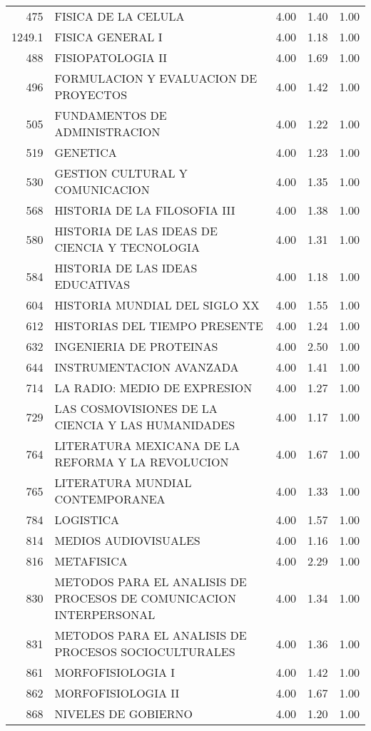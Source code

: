 \documentclass[12pt]{article}
\begin{document}
\begin{table}[ht]
\begin{tabular}{rlrrr}
  475 & FISICA DE LA CELULA & 4.00 & 1.40 & 1.00 \\ 
  1249.1 & FISICA GENERAL I & 4.00 & 1.18 & 1.00 \\ 
  488 & FISIOPATOLOGIA II & 4.00 & 1.69 & 1.00 \\ 
  496 & FORMULACION Y EVALUACION DE PROYECTOS & 4.00 & 1.42 & 1.00 \\ 
  505 & FUNDAMENTOS DE ADMINISTRACION & 4.00 & 1.22 & 1.00 \\ 
  519 & GENETICA & 4.00 & 1.23 & 1.00 \\ 
  530 & GESTION CULTURAL Y COMUNICACION & 4.00 & 1.35 & 1.00 \\ 
  568 & HISTORIA DE LA FILOSOFIA III & 4.00 & 1.38 & 1.00 \\ 
  580 & HISTORIA DE LAS IDEAS DE CIENCIA Y TECNOLOGIA & 4.00 & 1.31 & 1.00 \\ 
  584 & HISTORIA DE LAS IDEAS EDUCATIVAS & 4.00 & 1.18 & 1.00 \\ 
  604 & HISTORIA MUNDIAL DEL SIGLO XX & 4.00 & 1.55 & 1.00 \\ 
  612 & HISTORIAS DEL TIEMPO PRESENTE & 4.00 & 1.24 & 1.00 \\ 
  632 & INGENIERIA DE PROTEINAS & 4.00 & 2.50 & 1.00 \\ 
  644 & INSTRUMENTACION AVANZADA & 4.00 & 1.41 & 1.00 \\ 
  714 & LA RADIO: MEDIO DE EXPRESION & 4.00 & 1.27 & 1.00 \\ 
  729 & LAS COSMOVISIONES DE LA CIENCIA Y LAS HUMANIDADES & 4.00 & 1.17 & 1.00 \\ 
  764 & LITERATURA MEXICANA DE LA REFORMA Y LA REVOLUCION & 4.00 & 1.67 & 1.00 \\ 
  765 & LITERATURA MUNDIAL CONTEMPORANEA & 4.00 & 1.33 & 1.00 \\ 
  784 & LOGISTICA & 4.00 & 1.57 & 1.00 \\ 
  814 & MEDIOS AUDIOVISUALES & 4.00 & 1.16 & 1.00 \\ 
  816 & METAFISICA & 4.00 & 2.29 & 1.00 \\ 
  830 & METODOS PARA EL ANALISIS DE PROCESOS DE COMUNICACION INTERPERSONAL & 4.00 & 1.34 & 1.00 \\ 
  831 & METODOS PARA EL ANALISIS DE PROCESOS SOCIOCULTURALES & 4.00 & 1.36 & 1.00 \\ 
  861 & MORFOFISIOLOGIA I & 4.00 & 1.42 & 1.00 \\ 
  862 & MORFOFISIOLOGIA II & 4.00 & 1.67 & 1.00 \\ 
  868 & NIVELES DE GOBIERNO & 4.00 & 1.20 & 1.00 \\ 

\end{tabular}
\end{table}
\end{document}
